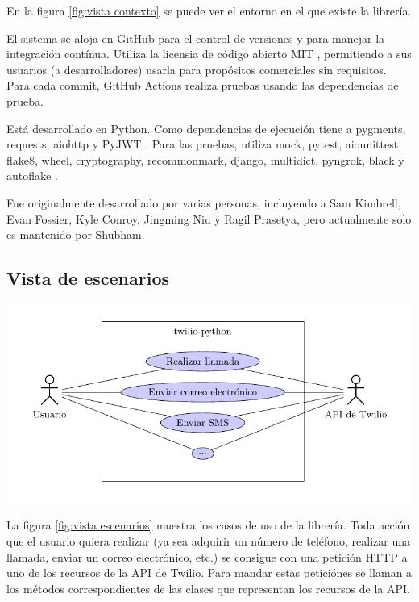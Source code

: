 \documentclass{article}
\begin{document}
\hfill

En la figura \ref{fig:vista contexto}
se puede ver el entorno en el que existe la librería.

El sistema se aloja en GitHub para el control de versiones
y para manejar la integración contínua.
Utiliza la licensia de código abierto MIT
\cite{twilio-license},
permitiendo a sus usuarios (a desarrolladores)
usarla para propósitos comerciales sin requisitos.
Para cada commit, GitHub Actions realiza pruebas
usando las dependencias de prueba.

Está desarrollado en Python.
Como dependencias de ejecución tiene a pygments, requests, aiohttp y PyJWT
\cite{twilio-runtime-dependencies}.
Para las pruebas, utiliza
mock, pytest, aiounittest, flake8,
wheel, cryptography, recommonmark,
django, multidict, pyngrok, black y autoflake
\cite{twilio-test-dependencies}.

Fue originalmente desarrollado por varias personas,
incluyendo a Sam Kimbrell, Evan Fossier,
Kyle Conroy, Jingming Niu y Ragil Prasetya,
pero actualmente solo es mantenido por Shubham.

\newpage

\subsection{Vista de escenarios}

\hfill

\begin{center}
  \includegraphics{usecase.pdf}
  \label{fig:vista escenarios}
\end{center}

\hfill

La figura \ref{fig:vista escenarios}
muestra los casos de uso de la librería.
Toda acción que el usuario quiera realizar
(ya sea adquirir un número de teléfono,
realizar una llamada,
enviar un correo electrónico, etc.)
se consigue con una petición HTTP
a uno de los recursos de la API de Twilio.
Para mandar estas peticiónes
se llaman a los métodos correspondientes
de las clases que representan los recursos de la API.
\end{document}
